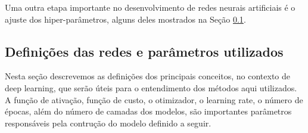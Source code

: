 Uma outra etapa importante no desenvolvimento de redes neurais artificiais é o ajuste dos hiper-parâmetros, alguns deles mostrados na Seção \ref{section:hyperparam}.

\subsection{Definições das redes e parâmetros utilizados}
\label{section:hyperparam}

Nesta seção descrevemos as definições dos principais conceitos, no contexto de deep learning, que serão úteis para o entendimento dos métodos aqui utilizados. A função de ativação, função de custo, o otimizador, o learning rate, o número de épocas, além do número de camadas dos modelos, são importantes parâmetros responsáveis pela contrução do modelo definido a seguir.


